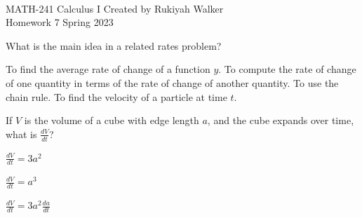 \documentclass[addpoints, 12pt]{exam}%
\newcommand{\spc}{\vspace*{0.5cm}}
\begin{document}
\noindent \hrulefill \\
	MATH-241 Calculus I \hfill Created by Rukiyah Walker\\
	Homework 7 \hfill Spring 2023\\ \vspace*{-1cm}
 
	\noindent\hrulefill


\begin{questions}

\vspace*{0.5cm}

\question[1]

What is the main idea in a related rates problem?

\begin{choices}
\choice To find the average rate of change of a function $y$. 
\CorrectChoice To compute the rate of change of one quantity in terms of the rate of change of another quantity.
\choice To use the chain rule.
\choice To find the velocity of a particle at time $t$.
\end{choices}

\spc

\question[1]

\begin{minipage}{0.5\textwidth}
If $V$ is the volume of a cube with edge length $a$, and the cube expands over time, what is $\frac{dV}{dt}$? 

\begin{multicols}{2}
\begin{choices}
\choice $\frac{dV}{dt} = 3a^2$\vspace*{10pt}

\choice $\frac{dV}{dt} = a^3$\vspace*{10pt}

\CorrectChoice $\frac{dV}{dt} = 3a^2\frac{da}{dt}$\vspace*{10pt}


\end{choices}
\end{multicols}
\end{minipage}
\end{questions}
\end{document}
